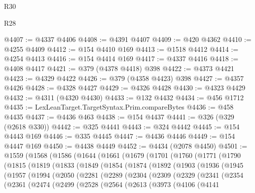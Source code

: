 \begin{lexlean}{R30}
\begin{lexlean}{R28}
\begin{coremodule}
{{{{{{{{{{{{{{{{{{{{{{{{{{{{{{{{{{{{{{{{{{{{{{{{{{{{{{{{{{{{{{{{{{{{{{{{{{{{{{{{{{{{{{{{{{{{{{{{{{{{{{{{{{{{{{{{{{{{{{{{{{{{{{{{{{{{{{{{{{{{{{{@4407 := @4337 @4406
@4408 := @4391 @4407
@4409 := @420 @4362
@4410 := @4255 @4409
@4412 := @154 @4410 @169
@4413 := @1518 @4412
@4414 := @4254 @4413
@4416 := @154 @4414 @169
@4417 := @4337 @4416
@4418 := @4408 @4417
@4421 := @379 (@4378 @4418) @398
@4422 := @4373 @4421
@4423 := @4329 @4422
@4426 := @379 (@4358 @4423) @398
@4427 := @4357 @4426
@4428 := @4328 @4427
@4429 := @4326 @4428
@4430 := @4323 @4429
@4432 := @4311 (@4320 @4430)
@4433 := @132 @4432
@4434 := @456 @1712
@4435 := LexLeanTarget.TargetSyntax.Prim.compareBytes
@4436 := @458 @4435
@4437 := @4436 @463
@4438 := @154 @4437
@4441 := @326 (@329 (@2618 @330))
@4442 := @325 @4441
@4443 := @324 @4442
@4445 := @154 @4443 @169
@4446 := @335 @4445
@4447 := @4436 @4446
@4449 := @154 @4447 @169
@4450 := @4438 @4449
@4452 := @4434 (@2078 @4450)
@4501 := @1559
    (@1568
      (@1586
        (@1644
          (@1661
            (@1679
              (@1701
                (@1760
                  (@1771
                    (@1790
                      (@1815
                        (@1819
                          (@1833
                            (@1849
                              (@1854
                                (@1874
                                  (@1892
                                    (@1903
                                      (@1936
                                        (@1945
                                          (@1957
                                            (@1994
                                              (@2050
                                                (@2281
                                                  (@2289
                                                    (@2304
                                                      (@2309
                                                        (@2329
                                                          (@2341
                                                            (@2354
                                                              (@2361
                                                                (@2474
                                                                  (@2499
                                                                    (@2528
                                                                      (@2564
                                                                        (@2613
                                                                          (@3973
                                                                            (@4106
                                                                              (@4141
}}}}}}}}}}}}}}}}}}}}}}}}}}}}}}}}}}}}}}}}}}}}}}}}}}}}}}}}}}}}}}}}}}}}}}}}}}}}}}}}}}}}}}}}}}}}}}}}}}}}}}}}}}}}}}}}}}}}}}}}}}}}}}}}}}}}}}}}}}}}}}}
\end{coremodule}
\end{lexlean}
\end{lexlean}

